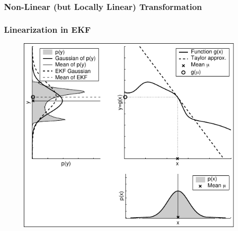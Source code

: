     \begin{frame}
     \frametitle{Non-Linear (but Locally Linear) Transformation}
    
     \begin{center}
     \end{center}
    
    
    \end{frame}
    
    
    \begin{frame}
     \frametitle{Linearization in EKF}
    
     \begin{figure}[!h]
     \includegraphics[width=0.5\columnwidth]{./images/linearization_applied_by_ekf.pdf}
     \end{figure}
    \end{frame}
    
